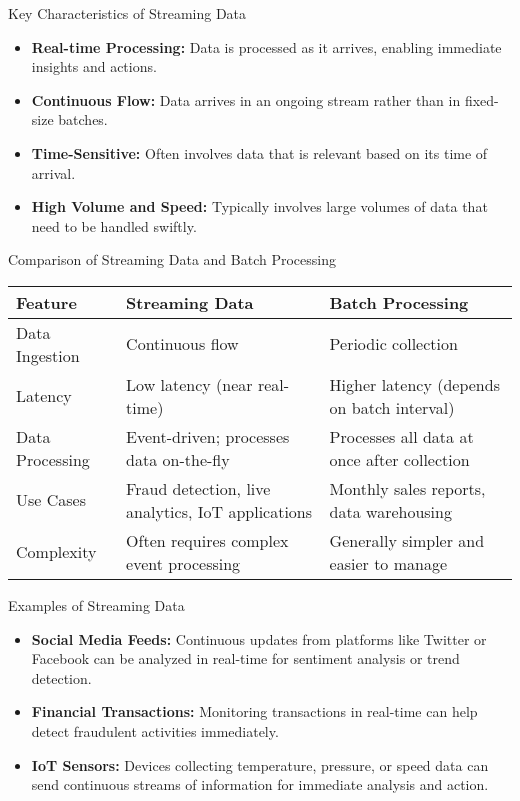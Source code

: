 \documentclass[aspectratio=169]{beamer}
\begin{document}
\begin{frame}[fragile]{Key Characteristics of Streaming Data}
\begin{itemize}
    \item \textbf{Real-time Processing:} Data is processed as it arrives, enabling immediate insights and actions.
    \item \textbf{Continuous Flow:} Data arrives in an ongoing stream rather than in fixed-size batches.
    \item \textbf{Time-Sensitive:} Often involves data that is relevant based on its time of arrival.
    \item \textbf{High Volume and Speed:} Typically involves large volumes of data that need to be handled swiftly.
\end{itemize}
\end{frame}

\begin{frame}[fragile]{Comparison of Streaming Data and Batch Processing}
\begin{tabular}{|l|l|l|}
\hline
\textbf{Feature} & \textbf{Streaming Data} & \textbf{Batch Processing} \\
\hline
Data Ingestion & Continuous flow & Periodic collection \\
Latency & Low latency (near real-time) & Higher latency (depends on batch interval) \\
Data Processing & Event-driven; processes data on-the-fly & Processes all data at once after collection \\
Use Cases & Fraud detection, live analytics, IoT applications & Monthly sales reports, data warehousing \\
Complexity & Often requires complex event processing & Generally simpler and easier to manage \\
\hline
\end{tabular}
\end{frame}

\begin{frame}[fragile]{Examples of Streaming Data}
\begin{itemize}
    \item \textbf{Social Media Feeds:} Continuous updates from platforms like Twitter or Facebook can be analyzed in real-time for sentiment analysis or trend detection.
    \item \textbf{Financial Transactions:} Monitoring transactions in real-time can help detect fraudulent activities immediately.
    \item \textbf{IoT Sensors:} Devices collecting temperature, pressure, or speed data can send continuous streams of information for immediate analysis and action.
\end{itemize}
\end{frame}
\end{document}
